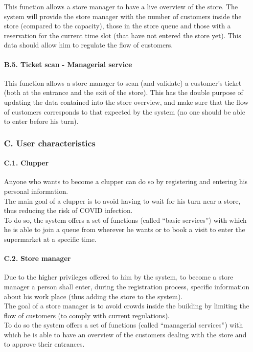 \documentclass[
]{article}
\begin{document}
This function allows a store manager to have a live overview of the
store. The system will provide the store manager with the number of
customers inside the store (compared to the capacity), those in the
store queue and those with a reservation for the current time slot (that
have not entered the store yet). This data should allow him to regulate
the flow of customers.

\hypertarget{b.5.-ticket-scan---managerial-service}{%
\paragraph{B.5. Ticket scan - Managerial
service}\label{b.5.-ticket-scan---managerial-service}}

This function allows a store manager to scan (and validate) a customer's
ticket (both at the entrance and the exit of the store). This has the
double purpose of updating the data contained into the store overview,
and make sure that the flow of customers corresponds to that expected by
the system (no one should be able to enter before his turn).

\hypertarget{c.-user-characteristics}{%
\subsubsection{C. User characteristics}\label{c.-user-characteristics}}

\hypertarget{c.1.-clupper}{%
\paragraph{C.1. Clupper}\label{c.1.-clupper}}

Anyone who wants to become a clupper can do so by registering and
entering his personal information.\\
The main goal of a clupper is to avoid having to wait for his turn near
a store, thus reducing the risk of COVID infection.\\
To do so, the system offers a set of functions (called ``basic
services'') with which he is able to join a queue from wherever he wants
or to book a visit to enter the supermarket at a specific time.

\hypertarget{c.2.-store-manager}{%
\paragraph{C.2. Store manager}\label{c.2.-store-manager}}

Due to the higher privileges offered to him by the system, to become a
store manager a person shall enter, during the registration process,
specific information about his work place (thus adding the store to the
system).\\
The goal of a store manager is to avoid crowds inside the building by
limiting the flow of customers (to comply with current regulations).\\
To do so the system offers a set of functions (called ``managerial
services'') with which he is able to have an overview of the customers
dealing with the store and to approve their entrances.
\end{document}
